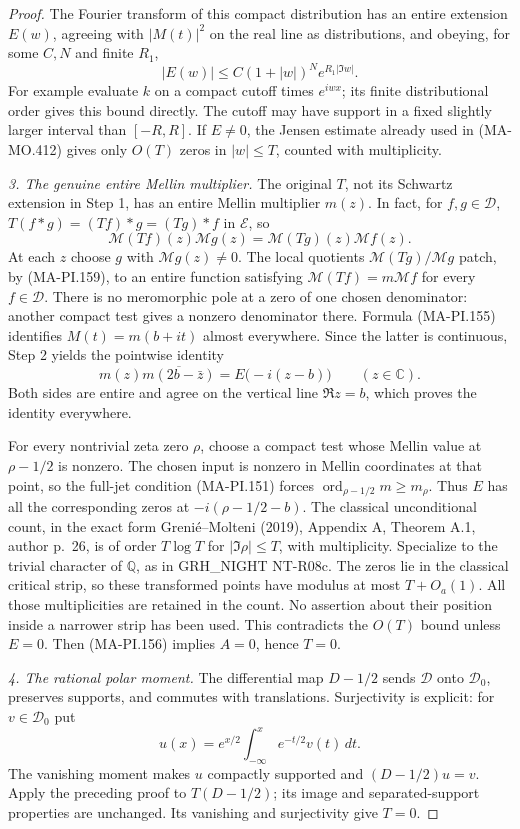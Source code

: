 \begin{proof}
The Fourier transform of this compact distribution has
an entire extension $E(w)$, agreeing with $|M(t)|^2$ on
the real line as distributions, and obeying, for some
$C,N$ and finite $R_1$,
\[
 |E(w)|\le C(1+|w|)^N e^{R_1|\Im w|}.
 \tag{MA-PI.158}
\]
For example evaluate $k$ on a compact cutoff times
$e^{iwx}$; its finite distributional order gives this
bound directly.  The cutoff may have support in a fixed
slightly larger interval than $[-R,R]$.  If $E\ne0$,
the Jensen estimate already used in (MA-MO.412) gives
only $O(T)$ zeros in $|w|\le T$, counted with multiplicity.

\emph{3. The genuine entire Mellin multiplier.}
The original $T$, not its Schwartz extension in Step 1,
has an entire Mellin multiplier $m(z)$.
In fact, for $f,g\in\mathcal D$,
$T(f*g)=(Tf)*g=(Tg)*f$ in $\mathcal E$, so
\[
     \mathcal M(Tf)(z)\mathcal Mg(z)
           =\mathcal M(Tg)(z)\mathcal Mf(z).
 \tag{MA-PI.159}
\]
At each $z$ choose $g$ with $\mathcal Mg(z)\ne0$.
The local quotients $\mathcal M(Tg)/\mathcal Mg$ patch,
by (MA-PI.159), to an entire function satisfying
$\mathcal M(Tf)=m\mathcal Mf$ for every $f\in\mathcal D$.
There is no meromorphic pole at a zero of one chosen
denominator: another compact test gives a nonzero
denominator there.  Formula (MA-PI.155) identifies
$M(t)=m(b+it)$ almost everywhere.  Since the latter is
continuous, Step 2 yields the pointwise identity
\[
 m(z)\overline{m(2b-\bar z)}
                  =E\bigl(-i(z-b)\bigr)\qquad(z\in\mathbb C).
 \tag{MA-PI.160}
\]
Both sides are entire and agree on the vertical line
$\Re z=b$, which proves the identity everywhere.

For every nontrivial zeta zero $\rho$, choose a compact
test whose Mellin value at $\rho-1/2$ is nonzero.
The chosen input is nonzero in Mellin coordinates at that
point, so the full-jet condition (MA-PI.151) forces
$\operatorname{ord}_{\rho-1/2}m\ge m_\rho$.
Thus $E$ has all the corresponding
zeros at
$-i(\rho-1/2-b)$.
The classical unconditional count, in the exact form
Greni\'e--Molteni (2019), Appendix A, Theorem A.1,
author p.~26, is of order $T\log T$ for $|\Im\rho|\le T$,
with multiplicity.  Specialize to the trivial character
of $\mathbb Q$, as in GRH\_NIGHT NT-R08c.  The zeros lie
in the classical critical strip, so these transformed
points have modulus at most $T+O_a(1)$.
All those multiplicities are retained in the count.
No assertion about their position inside a narrower strip
has been used.
This contradicts the $O(T)$ bound unless $E=0$.
Then (MA-PI.156) implies $A=0$, hence $T=0$.

\emph{4. The rational polar moment.}
The differential map $D-1/2$ sends $\mathcal D$ onto
$\mathcal D_0$, preserves supports, and commutes with
translations.  Surjectivity is explicit: for
$v\in\mathcal D_0$ put
\[
 u(x)=e^{x/2}\int_{-\infty}^x e^{-t/2}v(t)\,dt.
 \tag{MA-PI.161}
\]
The vanishing moment makes $u$ compactly supported and
$(D-1/2)u=v$.  Apply the preceding proof to
$T(D-1/2)$; its image and separated-support properties
are unchanged.  Its vanishing and surjectivity give $T=0$.
\end{proof}

